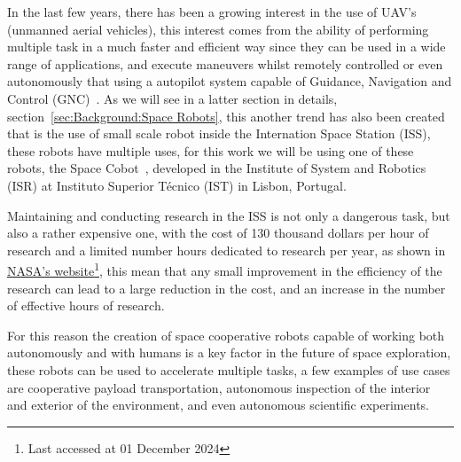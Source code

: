 \par In the last few years, there has been a growing interest in the use of UAV's (unmanned aerial vehicles), this interest comes from the ability  of performing multiple task in a much faster and efficient way since they can be used in a wide range of applications, and execute maneuvers whilst remotely controlled or even autonomously that using a autopilot system capable of Guidance, Navigation and Control (GNC)~\cite{chao2010autopilots}. As we will see in a latter section in details, section~\ref{sec:Background:Space Robots}, this another trend has also been created that is the use of small scale robot inside the Internation Space Station (ISS), these robots have multiple uses, for this work we will be using one of these robots, the Space Cobot~\cite{RoqueVentura2016spacecobot}, developed in the Institute of System and Robotics (ISR) at Instituto Superior Técnico (IST) in Lisbon, Portugal. 

Maintaining and conducting research in the ISS is not only a dangerous task, but also a rather expensive one, with the cost of 130 thousand dollars per hour of research and a limited number hours dedicated to research per year, as shown in  \href{https://www.nasa.gov/humans-in-space/commercial-and-marketing-pricing-policy/}{NASA's website}\footnote{Last accessed at 01 December 2024}, this mean that any small improvement in the efficiency of the research can lead to a large reduction in the cost, and an increase in the number of effective hours of research.

For this reason the creation of space cooperative robots capable of working both autonomously and with humans is a key factor in the future of space exploration, these robots can be used to accelerate multiple tasks, a few examples of use cases are cooperative payload transportation, autonomous inspection of the interior and exterior of the environment, and even autonomous scientific experiments. 